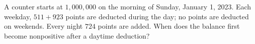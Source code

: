 A counter starts at $1{,}000{,}000$ on the morning of Sunday, January 1, 2023. Each weekday, $511+923$ points are deducted during the day; no points are deducted on weekends. Every night $724$ points are added. When does the balance first become nonpositive after a daytime deduction?
